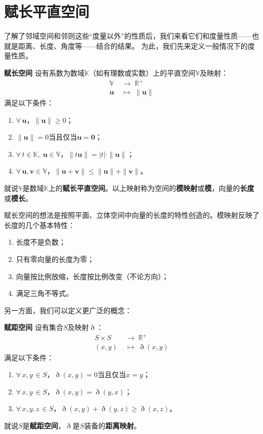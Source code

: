\documentclass[12pt,UTF8]{ctexbook}
\begin{document}
\section{赋长平直空间}

了解了邻域空间和邻则这些“度量以外”的性质后，我们来看它们和度量性质——也就是距离、长度、角度等——结合的结果。
为此，我们先来定义一般情况下的度量性质。

\begin{df}{\textbf{赋长空间}}
    设有系数为数域$\mathbb{K}$（如有理数或实数）上的平直空间$\mathbb{V}$及映射：
    \begin{align*}
        \mathbb{V} \;&\rightarrow \;\mathbb{R}^+ \\
        \mathbf{u} \;&\mapsto \;\| \mathbf{u} \|
    \end{align*}
    满足以下条件：
    \begin{enumerate}
        \item $\forall \, \mathbf{u}$，$\|\mathbf{u}\| \geqslant 0$；
        \item $\| \mathbf{u} \| = 0$当且仅当$\mathbf{u} = \mathbf{0}$；
        \item $\forall \, t \in \mathbb{K}, \; \mathbf{u}\in \mathbb{V}$，$\| t\mathbf{u}\| = |t|\cdot \|\mathbf{u}\|$；
        \item $\forall \, \mathbf{u}, \mathbf{v} \in \mathbb{V}$，$\|\mathbf{u} + \mathbf{v}\| \leqslant \|\mathbf{u}\| + \|\mathbf{v}\|$。
    \end{enumerate}
    就说$\mathbb{V}$是数域$\mathbb{K}$上的\textbf{赋长平直空间}。以上映射称为空间的\textbf{模映射}或\textbf{模}，向量的\textbf{长度}或\textbf{模长}。
\end{df}

赋长空间的想法是按照平面、立体空间中向量的长度的特性创造的。模映射反映了长度的几个基本特性：
\begin{enumerate}
    \item 长度不是负数；
    \item 只有零向量的长度为零；
    \item 向量按比例放缩，长度按比例改变（不论方向）；
    \item 满足三角不等式。
\end{enumerate}

另一方面，我们可以定义更广泛的概念：
\begin{df}{\textbf{赋距空间}}
    设有集合$S$及映射$\eth$：
    \begin{align*}
        S\times S \;&\rightarrow \; \mathbb{R}^+ \\
        (x, y) \;&\mapsto \; \eth(x, y)
    \end{align*}
    满足以下条件：
    \begin{enumerate}
        \item $\forall \, x, y\, \in S$，$\eth(x, y) = 0$当且仅当$x = y$；
        \item $\forall \, x, y\, \in S$，$\eth(x, y) = \eth(y, x)$；
        \item $\forall \, x, y, z\, \in S$，$\eth(x, y) + \eth(y, z) \geqslant \eth (x, z)$。
    \end{enumerate}
    就说$S$是\textbf{赋距空间}，$\eth$是$S$装备的\textbf{距离映射}。
\end{df}
\end{document}
